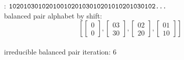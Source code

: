 : $ \text{\texttt{1020103010201001020103010201010201030102...}}  $ \\
balanced pair alphabet by shift: $$ \left[\begin{bmatrix}0\\ 0\end{bmatrix}, \begin{bmatrix}03\\ 30\end{bmatrix}, \begin{bmatrix}02\\ 20\end{bmatrix}, \begin{bmatrix}01\\ 10\end{bmatrix}\right] $$ \\
irreducible balanced pair iteration: 6  \\ 
